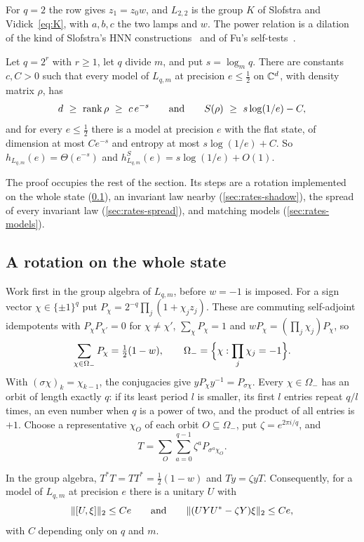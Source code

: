 For $q=2$ the row gives $z_1=z_0w$, and $L_{2,2}$ is the group $K$ of Slofstra and Vidick~\eqref{eq:K}, with $a,b,c$ the
two lamps and $w$. The power relation is a dilation of the kind of Slofstra's HNN constructions~\cite[Section~5]{Slo19}
and of Fu's self-tests~\cite{Fu22}.

\begin{theorem}\label{thm:lamp}
Let $q=2^r$ with $r\ge1$, let $q$ divide $m$, and put $s=\log_mq$. There are constants $c,C>0$ such that every model of
$L_{q,m}$ at precision $e\le\frac12$ on $\mathbb C^d$, with density matrix $\rho$, has
\[
d\ \ge\ \rank\rho\ \ge\ c\,e^{-s}\qquad\text{and}\qquad S(\rho)\ \ge\ s\log(1/e)-C ,
\]
and for every $e\le\frac12$ there is a model at precision $e$ with the flat state, of dimension at most $Ce^{-s}$ and
entropy at most $s\log(1/e)+C$. So $h_{L_{q,m}}(e)=\Theta(e^{-s})$ and $h^S_{L_{q,m}}(e)=s\log(1/e)+O(1)$.
\end{theorem}

The proof occupies the rest of the section. Its steps are a rotation implemented on the whole state
(\cref{sec:rates-rotation}), an invariant law nearby (\cref{sec:rates-shadow}), the spread of every invariant law
(\cref{sec:rates-spread}), and matching models (\cref{sec:rates-models}).

\subsection{A rotation on the whole state}\label{sec:rates-rotation}

Work first in the group algebra of $L_{q,m}$, before $w=-1$ is imposed. For a sign vector $\chi\in\{\pm1\}^q$ put
$P_\chi=2^{-q}\prod_j(1+\chi_jz_j)$. These are commuting self-adjoint idempotents with $P_\chi P_{\chi'}=0$ for
$\chi\ne\chi'$, $\sum_\chi P_\chi=1$ and $wP_\chi=(\prod_j\chi_j)P_\chi$, so
\[
\sum_{\chi\in\Omega_-}P_\chi=\tfrac12(1-w),\qquad\Omega_-=\Bigl\{\chi:\prod_j\chi_j=-1\Bigr\}.
\]
With $(\sigma\chi)_k=\chi_{k-1}$, the conjugacies give $yP_\chi y^{-1}=P_{\sigma\chi}$. Every $\chi\in\Omega_-$ has an orbit of
length exactly $q$: if its least period $l$ is smaller, its first $l$ entries repeat $q/l$ times, an even number when $q$ is
a power of two, and the product of all entries is $+1$. Choose a representative $\chi_O$ of each orbit $O\subseteq\Omega_-$,
put $\zeta=e^{2\pi i/q}$, and
\[
T=\sum_O\sum_{a=0}^{q-1}\zeta^aP_{\sigma^a\chi_O}.
\]

\begin{lemma}\label{lem:rotation-selector}
In the group algebra, $T^*T=TT^*=\frac12(1-w)$ and $Ty=\zeta yT$. Consequently, for a model of $L_{q,m}$ at precision $e$
there is a unitary $U$ with
\[
\lVert [U,\xi]\rVert_2\le Ce\qquad\text{and}\qquad\lVert (UYU^*-\zeta Y)\xi\rVert_2\le Ce ,
\]
with $C$ depending only on $q$ and $m$.
\end{lemma}

